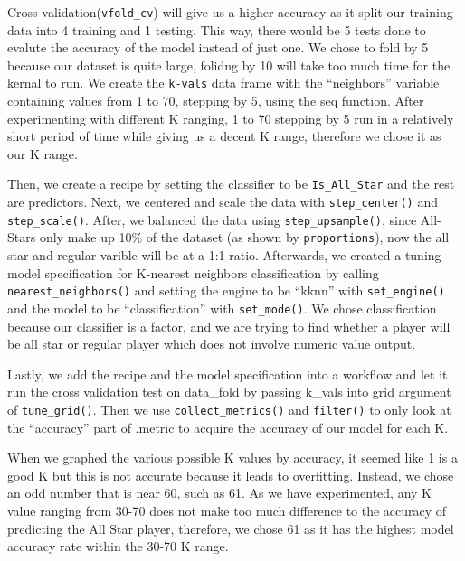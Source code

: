 \documentclass[
]{article}
\begin{document}
Cross validation(\texttt{vfold\_cv}) will give us a higher accuracy as it split our training data into 4 training and 1 testing. This way, there would be 5 tests done to evalute the accuracy of the model instead of just one. We chose to fold by 5 because our dataset is quite large, folidng by 10 will take too much time for the kernal to run. We create the \texttt{k-vals} data frame with the ``neighbors'' variable containing values from 1 to 70, stepping by 5, using the seq function. After experimenting with different K ranging, 1 to 70 stepping by 5 run in a relatively short period of time while giving us a decent K range, therefore we chose it as our K range.

Then, we create a recipe by setting the classifier to be \texttt{Is\_All\_Star} and the rest are predictors. Next, we centered and scale the data with \texttt{step\_center()} and \texttt{step\_scale()}. After, we balanced the data using \texttt{step\_upsample()}, since All-Stars only make up 10\% of the dataset (as shown by \texttt{proportions}), now the all star and regular varible will be at a 1:1 ratio. Afterwards, we created a tuning model specification for K-nearest neighbors classification by calling \texttt{nearest\_neighbors()} and setting the engine to be ``kknn'' with \texttt{set\_engine()} and the model to be ``classification'' with \texttt{set\_mode()}. We chose classification because our classifier is a factor, and we are trying to find whether a player will be all star or regular player which does not involve numeric value output.

Lastly, we add the recipe and the model specification into a workflow and let it run the cross validation test on data\_fold by passing k\_vals into grid argument of \texttt{tune\_grid()}. Then we use \texttt{collect\_metrics()} and \texttt{filter()} to only look at the ``accuracy'' part of .metric to acquire the accuracy of our model for each K.

When we graphed the various possible K values by accuracy, it seemed like 1 is a good K but this is not accurate because it leads to overfitting. Instead, we chose an odd number that is near 60, such as 61. As we have experimented, any K value ranging from 30-70 does not make too much difference to the accuracy of predicting the All Star player, therefore, we chose 61 as it has the highest model accuracy rate within the 30-70 K range.
\end{document}
